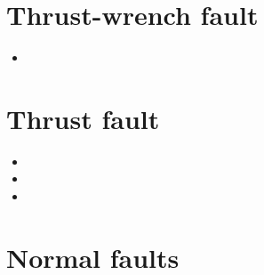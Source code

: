 \section{Thrust-wrench fault} 

\begin{scriptsize}
\begin{itemize}
\item[\twothousandfifteen] 
\end{itemize}
\end{scriptsize}

\section{Thrust fault} 

\begin{scriptsize}
\begin{itemize}
\item[\nineteenninety] 
\item[\nineteenninetytwo] 
\item[\twothousandfourteen] 
\end{itemize}
\end{scriptsize}

\section{Normal faults} 


